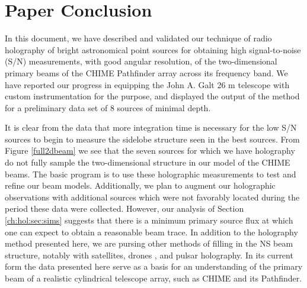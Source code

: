 \section{Paper Conclusion} \label{ch:hol:sec:conclusion}

In this document, we have described and validated our technique of radio holography of bright astronomical point sources for obtaining high signal-to-noise (S/N) measurements, with good angular resolution, of the two-dimensional primary beams of the CHIME Pathfinder array across its frequency band. We have reported our progress in equipping the John A. Galt 26 m telescope with custom instrumentation for the purpose, and displayed the output of the method for a preliminary data set of 8 sources of minimal depth. 

It is clear from the data that more integration time is necessary for the low S/N sources to begin to measure the sidelobe structure seen in the best sources. From Figure \ref{full2dbeam} we see that the seven sources for which we have holography do not fully sample the two-dimensional structure in our model of the CHIME beams. The basic program is to use these holographic measurements to test and refine our beam models. Additionally, we plan to augment our holographic observations with additional sources which were not favorably located during the period these data were collected. However, our analysis of Section \ref{ch:hol:sec:sims} suggests that there is a minimum primary source flux at which one can expect to obtain a reasonable beam trace. In addition to the holography method presented here, we are pursing other methods of filling in the NS beam structure, notably with satellites\citep{hol2, sat2}, drones \citep{drone}, and pulsar holography. In its current form the data presented here serve as a basis for an understanding of the primary beam of a realistic cylindrical telescope array, such as CHIME and its Pathfinder.
